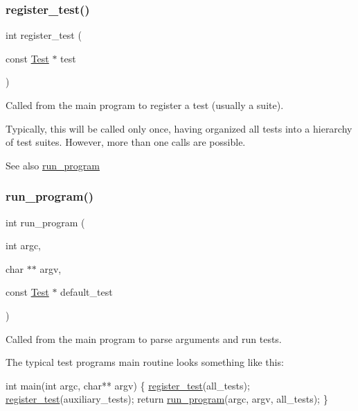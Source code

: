 \subsubsection{\texorpdfstring{register\+\_\+test()}{register\_test()}}
{\footnotesize\ttfamily int register\+\_\+test (\begin{DoxyParamCaption}\item[{const \hyperlink{structTest}{Test} $\ast$}]{test }\end{DoxyParamCaption})}



Called from the main program to register a test (usually a suite). 

Typically, this will be called only once, having organized all tests into a hierarchy of test suites. However, more than one calls are possible.

\begin{DoxySeeAlso}{See also}
\hyperlink{group__Testing_ga91dbdb97056588b088b689582abc2382}{run\+\_\+program} 
\end{DoxySeeAlso}
\mbox{\label{group__Testing_ga91dbdb97056588b088b689582abc2382}} 
\subsubsection{\texorpdfstring{run\+\_\+program()}{run\_program()}}
{\footnotesize\ttfamily int run\+\_\+program (\begin{DoxyParamCaption}\item[{int}]{argc,  }\item[{char $\ast$$\ast$}]{argv,  }\item[{const \hyperlink{structTest}{Test} $\ast$}]{default\+\_\+test }\end{DoxyParamCaption})}



Called from the main program to parse arguments and run tests. 

The typical test program\textquotesingle{}s main routine looks something like this\+: 
\begin{DoxyCode}
\textcolor{keywordtype}{int} main(\textcolor{keywordtype}{int} argc, \textcolor{keywordtype}{char}** argv) \{
    \hyperlink{group__Testing_ga4663cf3fb390b2a6d9cf1943f21b9934}{register\_test}(all\_tests);
    \hyperlink{group__Testing_ga4663cf3fb390b2a6d9cf1943f21b9934}{register\_test}(auxiliary\_tests);
    \textcolor{keywordflow}{return} \hyperlink{group__Testing_ga91dbdb97056588b088b689582abc2382}{run\_program}(argc, argv, all\_tests);
\}
\end{DoxyCode}
 \mbox{\label{group__Testing_gac023795199b4f577a9181ac45e62b170}} 
